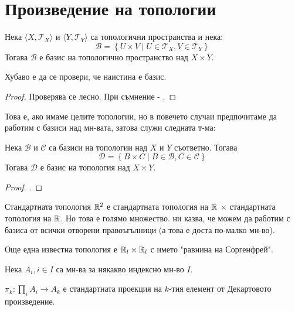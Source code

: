 \section{Произведение на топологии}
\begin{definition}
    Нека $\langle X, \mathcal T_X \rangle$ и $\langle Y,\mathcal T_Y \rangle$ са топологични пространства и нека:
    \begin{equation*}
        \mathcal B = \left\{U \times V \mid U \in \mathcal T_X, V \in \mathcal T_Y\right\}
    \end{equation*}
    Тогава $\mathcal B$ е базис на топологично пространство над $X \times Y$.
\end{definition}
Хубаво е да се провери, че наистина е базис.
\begin{proof}
    Проверява се лесно. При съмнение - \cite[p.~86]{munkrestopology}.
\end{proof}
Това е, ако имаме целите топологии, но в повечето случаи предпочитаме да работим с базиси над мн-вата, затова служи следната т-ма:
\begin{theorem}\label{thm:basis-of-times}
    Нека $\mathcal B$ и $\mathcal C$ са базиси на топологии над $X$ и $Y$ съответно. Тогава
    \begin{equation*}
        \mathcal D = \left\{ B \times C \mid B \in \mathcal B, C \in \mathcal C \right\}
    \end{equation*}
    Тогава $\mathcal D$ е базис на топология над $X \times Y$.
\end{theorem}
\begin{proof}
    \cite[p.~87]{munkrestopology}.
\end{proof}
\begin{example}
    Стандартната топология ${\mathbb{R}}^2$ е стандартната топология на ${\mathbb{R}}$ $\times$ стандартната топология на ${\mathbb{R}}$. Но това е голямо множество.  ни казва, че можем да работим с базиса от всички отворени правоъгълници (а това е доста по-малко мн-во).
\end{example}
\begin{example}
    Още една известна топология е ${\mathbb{R}}_l \times {\mathbb{R}}_l$ с името "равнина на Соргенфрей".
\end{example}
\begin{notation} 
    Нека $A_i, i \in I$ са мн-ва за някакво индексно мн-во $I$.
    
    $\pi_k : \prod\limits_i A_i \to A_k$ е стандартната проекция на $k$-тия елемент от Декартовото произведение.
\end{notation}
